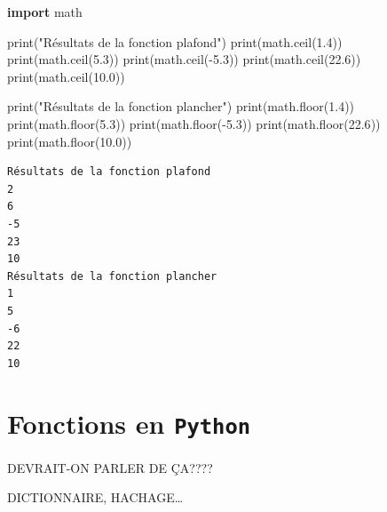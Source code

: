 \documentclass[
  letterpaper,
]{scrbook}
\newenvironment{Shaded}{\begin{snugshade}}{\end{snugshade}}
\newcommand{\BuiltInTok}[1]{\textcolor[rgb]{0.00,0.50,0.00}{#1}}
\newcommand{\FloatTok}[1]{\textcolor[rgb]{0.25,0.63,0.44}{#1}}
\newcommand{\ImportTok}[1]{\textcolor[rgb]{0.00,0.50,0.00}{\textbf{#1}}}
\newcommand{\NormalTok}[1]{\textcolor[rgb]{0.00,0.44,0.13}{#1}}
\newcommand{\OperatorTok}[1]{\textcolor[rgb]{0.40,0.40,0.40}{#1}}
\newcommand{\StringTok}[1]{\textcolor[rgb]{0.25,0.44,0.63}{#1}}
\theoremstyle{plain}
\theoremstyle{definition}
\theoremstyle{definition}
\theoremstyle{remark}
\begin{document}
\hypertarget{fonctions-planchers-plafonds}{}
\begin{Shaded}
\begin{Highlighting}[]
\ImportTok{import}\NormalTok{ math}

\BuiltInTok{print}\NormalTok{(}\StringTok{"Résultats de la fonction plafond"}\NormalTok{)}
\BuiltInTok{print}\NormalTok{(math.ceil(}\FloatTok{1.4}\NormalTok{))}
\BuiltInTok{print}\NormalTok{(math.ceil(}\FloatTok{5.3}\NormalTok{))}
\BuiltInTok{print}\NormalTok{(math.ceil(}\OperatorTok{{-}}\FloatTok{5.3}\NormalTok{))}
\BuiltInTok{print}\NormalTok{(math.ceil(}\FloatTok{22.6}\NormalTok{))}
\BuiltInTok{print}\NormalTok{(math.ceil(}\FloatTok{10.0}\NormalTok{))}

\BuiltInTok{print}\NormalTok{(}\StringTok{"Résultats de la fonction plancher"}\NormalTok{)}
\BuiltInTok{print}\NormalTok{(math.floor(}\FloatTok{1.4}\NormalTok{))}
\BuiltInTok{print}\NormalTok{(math.floor(}\FloatTok{5.3}\NormalTok{))}
\BuiltInTok{print}\NormalTok{(math.floor(}\OperatorTok{{-}}\FloatTok{5.3}\NormalTok{))}
\BuiltInTok{print}\NormalTok{(math.floor(}\FloatTok{22.6}\NormalTok{))}
\BuiltInTok{print}\NormalTok{(math.floor(}\FloatTok{10.0}\NormalTok{))}
\end{Highlighting}
\end{Shaded}

\begin{verbatim}
Résultats de la fonction plafond
2
6
-5
23
10
Résultats de la fonction plancher
1
5
-6
22
10
\end{verbatim}

\hypertarget{fonctions-en-python}{%
\section{\texorpdfstring{Fonctions en
\texttt{Python}}{Fonctions en Python}}\label{fonctions-en-python}}

DEVRAIT-ON PARLER DE ÇA????

DICTIONNAIRE, HACHAGE\ldots{}
\end{document}
